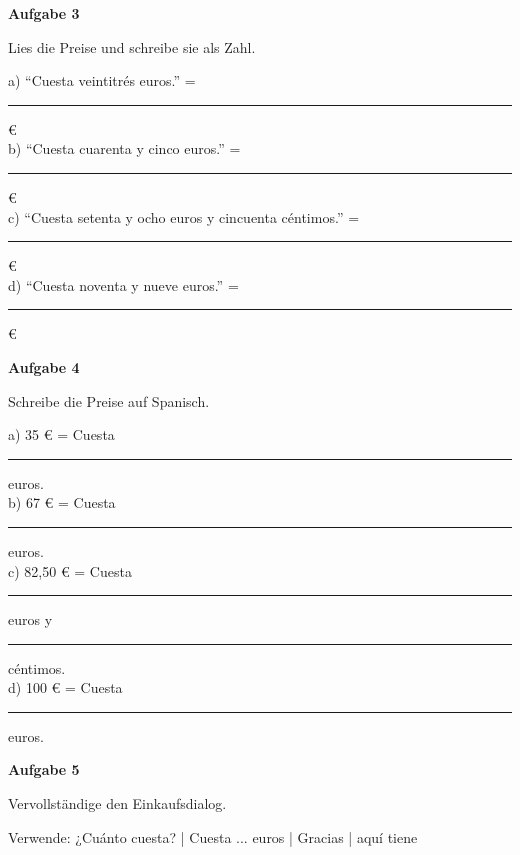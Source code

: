 \documentclass[11pt, a4paper]{article}
\newcommand{\fachfarbe}{spanisch}
\newcommand{\punktebox}[1]{\hfill\fbox{\small \_/#1}}
\newcommand{\luecke}[1]{\rule{#1}{0.4pt}}
\newenvironment{aufgabe}[1]{%
    \needspace{5\baselineskip}%
    \nopagebreak[4]%
    \vspace{10pt}
    \noindent\textbf{\textcolor{\fachfarbe}{Aufgabe #1}}
    \nopagebreak[4]%
    \vspace{5pt}
    \nopagebreak[4]%
    \begin{list}{}{\leftmargin=0pt}
    \item[]
}{%
    \end{list}
}
\begin{document}
\vspace{10pt}


\begin{aufgabe}{3}
Lies die Preise und schreibe sie als Zahl. \punktebox{4}
\end{aufgabe}

\noindent
a) ``Cuesta veintitrés euros.'' = \luecke{2cm} € \\[0.8em]
b) ``Cuesta cuarenta y cinco euros.'' = \luecke{2cm} € \\[0.8em]
c) ``Cuesta setenta y ocho euros y cincuenta céntimos.'' = \luecke{2cm} € \\[0.8em]
d) ``Cuesta noventa y nueve euros.'' = \luecke{2cm} € \\

\vspace{15pt}


\begin{aufgabe}{4}
Schreibe die Preise auf Spanisch. \punktebox{4}
\end{aufgabe}

\noindent
a) 35 € = Cuesta \luecke{6cm} euros. \\[0.8em]
b) 67 € = Cuesta \luecke{6cm} euros. \\[0.8em]
c) 82,50 € = Cuesta \luecke{4cm} euros y \luecke{4cm} céntimos. \\[0.8em]
d) 100 € = Cuesta \luecke{6cm} euros. \\

\vspace{15pt}


\begin{aufgabe}{5}
Vervollständige den Einkaufsdialog. \punktebox{4}
\end{aufgabe}

\begin{hinweis}
Verwende: ¿Cuánto cuesta? | Cuesta ... euros | Gracias | aquí tiene
\end{hinweis}
\end{document}

